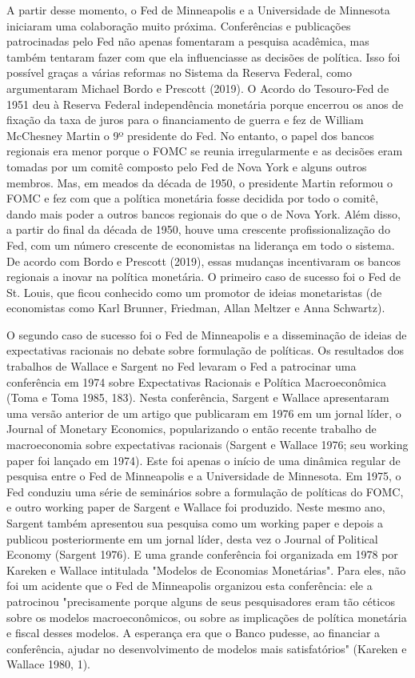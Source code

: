 \documentclass[12pt]{article}
\begin{document}
A partir desse momento, o Fed de Minneapolis e a Universidade de Minnesota iniciaram uma colaboração muito próxima. Conferências e publicações patrocinadas pelo Fed não apenas fomentaram a pesquisa acadêmica, mas também tentaram fazer com que ela influenciasse as decisões de política. Isso foi possível graças a várias reformas no Sistema da Reserva Federal, como argumentaram Michael Bordo e Prescott (2019). O Acordo do Tesouro-Fed de 1951 deu à Reserva Federal independência monetária porque encerrou os anos de fixação da taxa de juros para o financiamento de guerra e fez de William McChesney Martin o 9º presidente do Fed. No entanto, o papel dos bancos regionais era menor porque o FOMC se reunia irregularmente e as decisões eram tomadas por um comitê composto pelo Fed de Nova York e alguns outros membros. Mas, em meados da década de 1950, o presidente Martin reformou o FOMC e fez com que a política monetária fosse decidida por todo o comitê, dando mais poder a outros bancos regionais do que o de Nova York. Além disso, a partir do final da década de 1950, houve uma crescente profissionalização do Fed, com um número crescente de economistas na liderança em todo o sistema. De acordo com Bordo e Prescott (2019), essas mudanças incentivaram os bancos regionais a inovar na política monetária. O primeiro caso de sucesso foi o Fed de St. Louis, que ficou conhecido como um promotor de ideias monetaristas (de economistas como Karl Brunner, Friedman, Allan Meltzer e Anna Schwartz).

O segundo caso de sucesso foi o Fed de Minneapolis e a disseminação de ideias de expectativas racionais no debate sobre formulação de políticas. Os resultados dos trabalhos de Wallace e Sargent no Fed levaram o Fed a patrocinar uma conferência em 1974 sobre Expectativas Racionais e Política Macroeconômica (Toma e Toma 1985, 183). Nesta conferência, Sargent e Wallace apresentaram uma versão anterior de um artigo que publicaram em 1976 em um jornal líder, o Journal of Monetary Economics, popularizando o então recente trabalho de macroeconomia sobre expectativas racionais (Sargent e Wallace 1976; seu working paper foi lançado em 1974). Este foi apenas o início de uma dinâmica regular de pesquisa entre o Fed de Minneapolis e a Universidade de Minnesota. Em 1975, o Fed conduziu uma série de seminários sobre a formulação de políticas do FOMC, e outro working paper de Sargent e Wallace foi produzido. Neste mesmo ano, Sargent também apresentou sua pesquisa como um working paper e depois a publicou posteriormente em um jornal líder, desta vez o Journal of Political Economy (Sargent 1976). E uma grande conferência foi organizada em 1978 por Kareken e Wallace intitulada "Modelos de Economias Monetárias". Para eles, não foi um acidente que o Fed de Minneapolis organizou esta conferência: ele a patrocinou "precisamente porque alguns de seus pesquisadores eram tão céticos sobre os modelos macroeconômicos, ou sobre as implicações de política monetária e fiscal desses modelos. A esperança era que o Banco pudesse, ao financiar a conferência, ajudar no desenvolvimento de modelos mais satisfatórios" (Kareken e Wallace 1980, 1).
\end{document}
